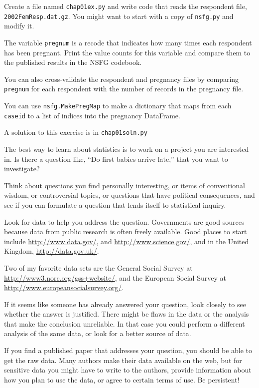 \begin{exercise}
Create a file named \verb"chap01ex.py" and write code that reads
the respondent file, {\tt 2002FemResp.dat.gz}.  You might want to
start with a copy of {\tt nsfg.py} and modify it.

The variable {\tt pregnum} is a recode that indicates how many
times each respondent has been pregnant.  Print the value counts
for this variable and compare them to the published results in
the NSFG codebook.

You can also cross-validate the respondent and pregnancy files by
comparing {\tt pregnum} for each respondent with the number of
records in the pregnancy file.

You can use {\tt nsfg.MakePregMap} to make a dictionary that maps
from each {\tt caseid} to a list of indices into the pregnancy
DataFrame.

A solution to this exercise is in \verb"chap01soln.py"
\end{exercise}


\begin{exercise}
The best way to learn about statistics is to work on a project you are
interested in.  Is there a question like, ``Do first babies arrive
late,'' that you want to investigate?

Think about questions you find personally interesting, or items of
conventional wisdom, or controversial topics, or questions that have
political consequences, and see if you can formulate a question that
lends itself to statistical inquiry.

Look for data to help you address the question.  Governments are good
sources because data from public research is often freely
available.  Good places to start include \url{http://www.data.gov/},
and \url{http://www.science.gov/}, and in the United Kingdom,
\url{http://data.gov.uk/}.

Two of my favorite data sets are the General Social Survey at
\url{http://www3.norc.org/gss+website/}, and the European Social
Survey at \url{http://www.europeansocialsurvey.org/}.

If it seems like someone has already answered your question, look
closely to see whether the answer is justified.  There might be flaws
in the data or the analysis that make the conclusion unreliable.  In
that case you could perform a different analysis of the same data, or
look for a better source of data.

If you find a published paper that addresses your question, you
should be able to get the raw data.  Many authors make their data
available on the web, but for sensitive data you might have to
write to the authors, provide information about how you plan to use
the data, or agree to certain terms of use.  Be persistent!

\end{exercise}


